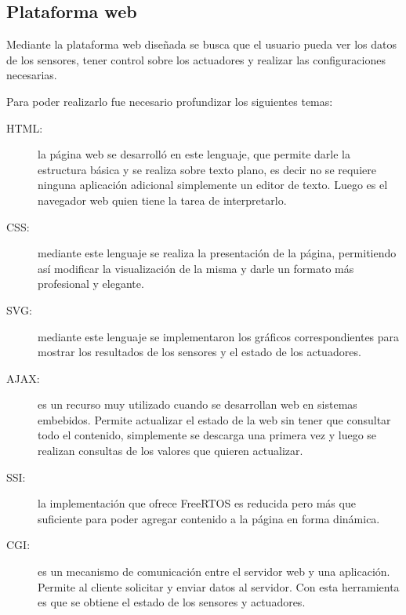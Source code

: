 \subsection{ Plataforma web}
Mediante la plataforma web diseñada se busca que el usuario pueda ver los datos de los sensores, tener control sobre los actuadores y realizar las configuraciones necesarias. 

Para poder realizarlo fue necesario profundizar los siguientes temas:
\begin{description}
  \item[HTML:] la página web se desarrolló en este lenguaje, que permite darle la estructura básica y se realiza sobre texto plano, es decir no se requiere ninguna aplicación adicional simplemente un editor de texto. Luego es el navegador web quien tiene la tarea de interpretarlo. 
  \item[CSS:] mediante este lenguaje se realiza la presentación de la página, permitiendo así modificar la visualización de la misma y darle un formato más profesional y elegante.
  \item[SVG:] mediante este lenguaje se implementaron los gráficos correspondientes para mostrar los resultados de los sensores y el estado de los actuadores.
  \item[AJAX:] es un recurso muy utilizado cuando se desarrollan web en sistemas embebidos. Permite actualizar el estado de la web sin tener que consultar todo el contenido, simplemente se descarga una primera vez y luego se realizan consultas de los valores que quieren actualizar. 
  \item[SSI:] la implementación que ofrece FreeRTOS es reducida pero más que suficiente para poder agregar contenido a la página en forma dinámica.
  \item[CGI:] es un mecanismo de comunicación entre el servidor web y una aplicación. Permite al cliente solicitar y enviar datos al servidor. Con esta herramienta es que se obtiene el estado de los sensores y actuadores.
\end{description}

